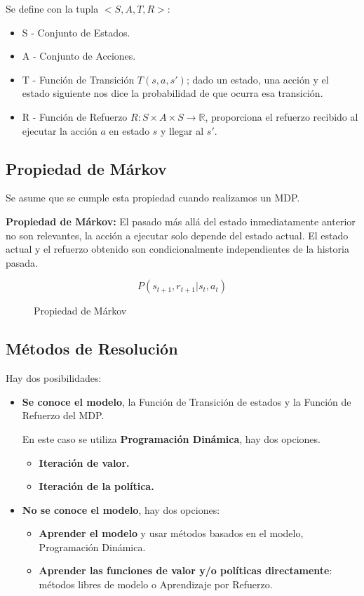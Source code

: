 \documentclass[12pt, twoside, openright]{report} %
\begin{document}
Se define con la tupla $<S, A, T, R>$:
\begin{itemize}
  \item S - Conjunto de Estados.
  \item A - Conjunto de Acciones.
  \item T - Función de Transición $T(s, a, s')$; dado un estado, una acción y el estado siguiente nos dice la probabilidad de que ocurra esa transición.
  \item R - Función de Refuerzo $R: S \times A \times S \rightarrow \mathbb{R}$, proporciona el refuerzo recibido al ejecutar la acción $a$ en estado $s$ y llegar al $s'$.
\end{itemize}

\subsection{Propiedad de Márkov}
Se asume que se cumple esta propiedad cuando realizamos un MDP.

\textbf{Propiedad de Márkov:} El pasado más allá del estado inmediatamente anterior no son relevantes, la acción a ejecutar solo depende del estado actual. El estado actual y el refuerzo obtenido son condicionalmente independientes de la historia pasada.
\begin{figure}[H]
  $$P(s_{t+1}, r_{t+1}| s_t,a_t)$$
    \captionsetup{justification=centering}
  \caption{Propiedad de Márkov}
\end{figure}

\subsection{Métodos de Resolución}
Hay dos posibilidades:
\begin{itemize}
  \item \textbf{Se conoce el modelo}, la Función de Transición de estados y la Función de Refuerzo del MDP.
  
  En este caso se utiliza \textbf{Programación Dinámica}, hay dos opciones.
  \begin{itemize}
    \item \textbf{Iteración de valor.}
    \item \textbf{Iteración de la política.}
  \end{itemize}

  \item \textbf{No se conoce el modelo}, hay dos opciones:
  \begin{itemize}
    \item \textbf{Aprender el modelo} y usar métodos basados en el modelo, Programación Dinámica.
    \item \textbf{Aprender las funciones de valor y/o políticas directamente}: métodos libres de modelo o Aprendizaje por Refuerzo.
  \end{itemize}
\end{itemize}
\end{document}
